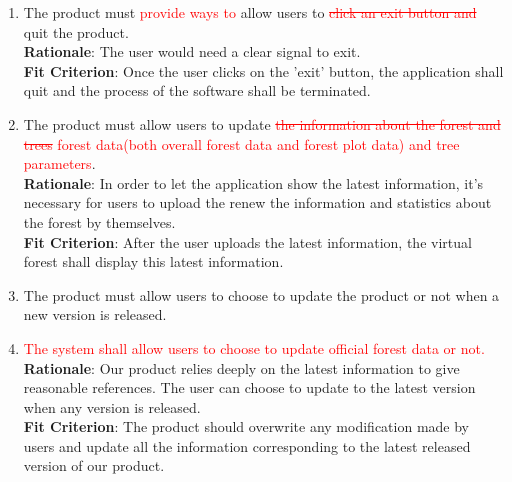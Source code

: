 \documentclass{article}
\begin{document}
\begin{enumerate}[FR1]
	\item The product must \textcolor{red}{provide ways to }allow users to \textcolor{red}{\st{click an
	 exit button and}} quit the product.\\
	\textbf{Rationale}: The user would need a clear signal to exit.\\
	\textbf{Fit Criterion}: Once the user clicks on the 'exit' button, the application shall quit and the process of the software shall be terminated.
    
    \item The product must allow users to update \textcolor{red}{\st{the information about the forest
     and trees} forest data(both overall forest data and forest plot data) and tree parameters}.\\
	\textbf{Rationale}: In order to let the application show the latest information, it's necessary for
	 users to upload the renew the information and statistics about the forest by themselves.\\
	\textbf{Fit Criterion}: After the user uploads the latest information, the virtual forest shall
	 display this latest information. 
	
	\item The product must allow users to choose to update the product or not when a new version is
	 released. 
	 
	 \item \textcolor{red}{The system shall allow users to choose to update official forest data or
	 not.}\\
	\textbf{Rationale}: Our product relies deeply on the latest information to give reasonable
	 references. The user can choose to update to the latest version when any version is released.\\
	\textbf{Fit Criterion}: The product should overwrite any modification made by users and update all
	 the information corresponding to the latest released version of our product.
\end{enumerate}
\end{document}
